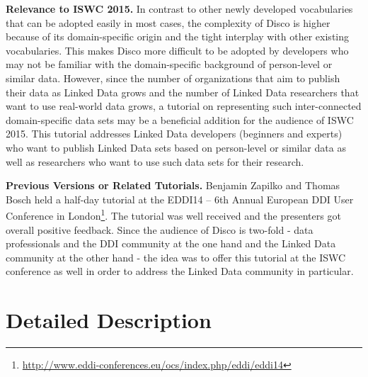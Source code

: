 \documentclass{llncs}
\begin{document}
\textbf{Relevance to ISWC 2015.}
In contrast to other newly developed vocabularies that can be adopted easily in most cases, the complexity of Disco is higher because of its domain-specific origin and the tight interplay with other existing vocabularies. This makes Disco more difficult to be adopted by developers who may not be familiar with the domain-specific background of person-level or similar data. However, since the number of organizations that aim to publish their data as Linked Data grows and the number of Linked Data researchers that want to use real-world data grows, a tutorial on representing such inter-connected domain-specific data sets may be a beneficial addition for the audience of ISWC 2015.
This tutorial addresses Linked Data developers (beginners and experts) who want to publish Linked Data sets based on person-level or similar data as well as researchers who want to use such data sets for their research.

\textbf{Previous Versions or Related Tutorials.}
Benjamin Zapilko and Thomas Bosch held a half-day tutorial at the EDDI14 – 6th Annual European DDI User Conference in London\footnote{\url{http://www.eddi-conferences.eu/ocs/index.php/eddi/eddi14}}.
The tutorial was well received and the presenters got overall positive feedback. Since the audience of Disco is two-fold - data professionals and the DDI community at the one hand and the Linked Data community at the other hand - the idea was to offer this tutorial at the ISWC conference as well in order to address the Linked Data community in particular.

\section{Detailed Description}
\end{document}
